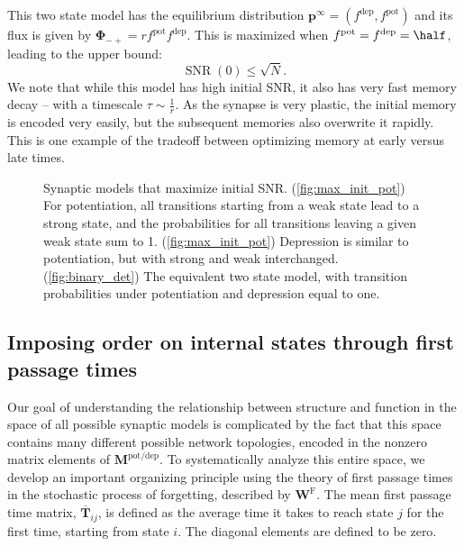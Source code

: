 \documentclass{article} %
\DeclareMathOperator{\snr}{SNR}
\newcommand{\pr}{\mathbf{p}}
\newcommand{\eq}{\pr^\infty}
\newcommand{\fpt}{\mathbf{T}}
\newcommand{\fptb}{\overline{\fpt}}
\newcommand{\W}{\mathbf{W}}
\newcommand{\M}{\mathbf{M}}
\newcommand{\frg}{\W^{\mathrm{F}}}
\newcommand{\F}{\boldsymbol{\Phi}}
\newcommand{\pot}{^{\text{pot}}}
\newcommand{\dep}{^{\text{dep}}}
\newcommand{\potdep}{^{\text{pot/dep}}}
\begin{document}
This two state model has the equilibrium distribution $\eq=(f\dep,f\pot)$ and its flux is given by $\F_{-+} = rf\pot f\dep$.
This is maximized when $f\pot=f\dep=\half$, leading to the upper bound:
%
\begin{equation}\label{eq:max_init}
  \snr(0) \leq \sqrt{N}.
\end{equation}
%
We note that while this model has high initial SNR, it also has very fast memory decay -- with a timescale $\tau\sim\frac{1}{r}$.
As the synapse is very plastic, the initial memory is encoded very easily, but the subsequent memories also overwrite it rapidly.
This is one example of the tradeoff between optimizing memory at early versus late times.
\begin{figure}[tbp]
 \begin{center}
 \begin{myenuma}
  \item\hp{}\label{fig:max_init_pot}\hp
  \item{}\label{fig:max_init_dep}\hp
  \item\hp{}\label{fig:binary_det}
  \end{myenuma}
 \end{center}
  \caption{Synaptic models that maximize initial SNR.
  (\ref{fig:max_init_pot}) For potentiation, all transitions starting from a weak state lead to a strong state, and the probabilities for all transitions leaving a given weak state sum to 1.
  (\ref{fig:max_init_pot}) Depression is similar to potentiation, but with strong and weak interchanged.
  (\ref{fig:binary_det}) The equivalent two state model, with transition probabilities under potentiation and depression equal to one.
  }\label{fig:max_init}
\end{figure}


\subsection{Imposing order on internal states through first passage times}\label{sec:order}


Our goal of understanding the relationship between structure and function in the space of all possible synaptic models is complicated by the fact that this space contains many different possible network topologies, encoded in the nonzero matrix elements of $\M\potdep$.  To systematically analyze this entire space, we develop an important organizing principle using the theory of first passage times in the stochastic process of forgetting, described by $\frg$.
The mean first passage time matrix, $\fptb_{ij}$, is defined as the average time it takes to reach state $j$ for the first time, starting from state $i$.
The diagonal elements are defined to be zero.
\end{document}
